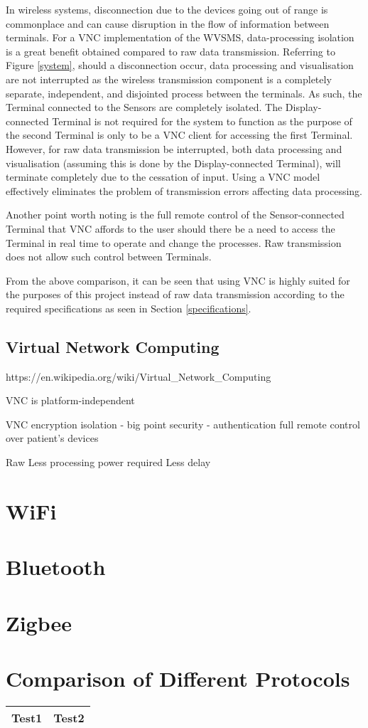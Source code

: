 In wireless systems, disconnection due to the devices going out of range is commonplace and can cause disruption in the flow of information between terminals. For a VNC implementation of the WVSMS, data-processing isolation is a great benefit obtained compared to raw data transmission. Referring to Figure \ref{system}, should a disconnection occur, data processing and visualisation are not interrupted as the wireless transmission component is a completely separate, independent, and disjointed process between the terminals. As such, the Terminal connected to the Sensors are completely isolated. The Display-connected Terminal is not required for the system to function as the purpose of the second Terminal is only to be a VNC client for accessing the first Terminal. However, for raw data transmission be interrupted, both data processing and visualisation (assuming this is done by the Display-connected Terminal), will terminate completely due to the cessation of input. Using a VNC model effectively eliminates the problem of transmission errors affecting data processing.  

Another point worth noting is the full remote control of the Sensor-connected Terminal that VNC affords to the user should there be a need to access the Terminal in real time to operate and change the processes. Raw transmission does not allow such control between Terminals. 

From the above comparison, it can be seen that using VNC is highly suited for the purposes of this project instead of raw data transmission according to the required specifications as seen in Section \ref{specifications}. \\

\subsection{Virtual Network Computing}
\label{vnc}

https://en.wikipedia.org/wiki/Virtual\_Network\_Computing 

VNC is platform-independent 

VNC
encryption
isolation - big point
security - authentication
full remote control over patient's devices 

Raw 
Less processing power required
Less delay

\section{WiFi}

\section{Bluetooth}

\section{Zigbee}

\section{Comparison of Different Protocols}

\begin{center}
	\begin{tabular}{| l | l |}
		\hline
		Test1 & Test2 \\ \hline
	\end{tabular}
\end{center}
